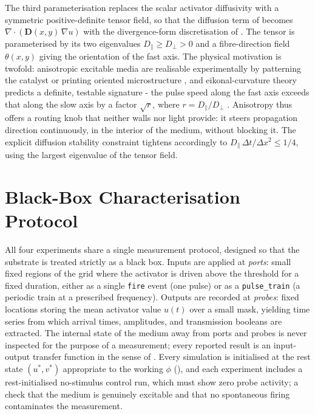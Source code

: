 The third parameterisation replaces the scalar activator diffusivity with a symmetric positive-definite tensor field, so that the diffusion term of  becomes $\nabla\!\cdot\!(\mathbf{D}(x,y)\,\nabla u)$ with the divergence-form discretisation of . 
The tensor is parameterised by its two eigenvalues $D_{\parallel} \geq D_{\perp} > 0$ and a fibre-direction field $\theta(x,y)$ giving the orientation of the fast axis. 
The physical motivation is twofold: anisotropic excitable media are realisable experimentally by patterning the catalyst or printing oriented microstructure \cite{steinbock1995anisotropy}, and eikonal-curvature theory predicts a definite, testable signature - the pulse speed along the fast axis exceeds that along the slow axis by a factor $\sqrt{r}$, where $r = D_{\parallel}/D_{\perp}$ \cite{keener1991eikonal}. 
Anisotropy thus offers a routing knob that neither walls nor light provide: it steers propagation direction continuously, in the interior of the medium, without blocking it. 
The explicit diffusion stability constraint tightens accordingly to $D_{\parallel}\,\Delta t/\Delta x^{2} \leq 1/4$, using the largest eigenvalue of the tensor field.

\section{Black-Box Characterisation Protocol}
\label{sec:meth_protocol}

All four experiments share a single measurement protocol, designed so that the substrate is treated strictly as a black box. 
Inputs are applied at \emph{ports}: small fixed regions of the grid where the activator is driven above the threshold for a fixed duration, either as a single \texttt{fire} event (one pulse) or as a \texttt{pulse\_train} (a periodic train at a prescribed frequency). 
Outputs are recorded at \emph{probes}: fixed locations storing the mean activator value $u(t)$ over a small mask, yielding time series from which arrival times, amplitudes, and transmission booleans are extracted. 
The internal state of the medium away from ports and probes is never inspected for the purpose of a measurement; every reported result is an input-output transfer function in the sense of . 
Every simulation is initialised at the rest state $(u^{*}, v^{*})$ appropriate to the working $\phi$ (), and each experiment includes a rest-initialised no-stimulus control run, which must show zero probe activity; a check that the medium is genuinely excitable and that no spontaneous firing contaminates the measurement.

